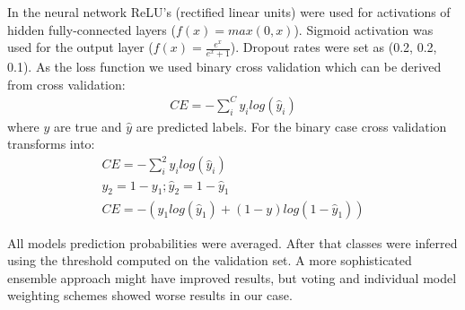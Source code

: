 \documentclass[conference]{IEEEtran}
\begin{document}
	In the neural network ReLU's (rectified linear units) were used for activations of hidden fully-connected layers ($f(x) = max(0, x)$). Sigmoid activation was used for the output layer ($f(x) = \frac{e^x}{e^x + 1}$). Dropout rates were set as (0.2, 0.2, 0.1). As the loss function we used binary cross validation which can be derived from cross validation:
	\begin{align*}
		CE = -\sum_{i}^{C}y_{i} log (\hat{y}_{i})
	\end{align*}
	where $y$ are true and $\hat{y}$ are predicted labels.
	For the binary case cross validation transforms into:
	\begin{align*}
		CE = -\sum_{i}^{2}y_{i} log (\hat{y}_{i}) \\
		y_2 = 1 - y_1; \hat{y}_2 = 1 - \hat{y}_1 \\
		CE = - (y_1log(\hat{y}_1) + (1 - y)log(1 - \hat{y}_1))
	\end{align*}
	
	All models prediction probabilities were averaged. After that classes were inferred using the threshold computed on the validation set. A more sophisticated ensemble approach might have improved results, but voting and individual model weighting schemes showed worse results in our case.
	
\end{document}

